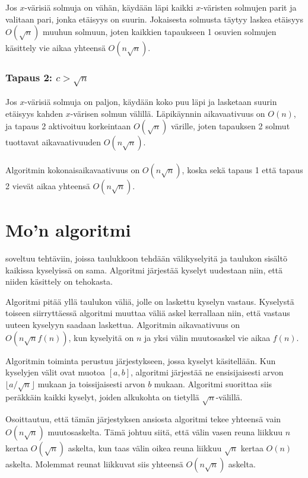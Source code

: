 Jos $x$-värisiä solmuja on vähän,
käydään läpi kaikki $x$-väristen solmujen parit
ja valitaan pari, jonka etäisyys on suurin.
Jokaisesta solmusta täytyy
laskea etäisyys $O(\sqrt n)$ muuhun solmuun,
joten kaikkien tapaukseen 1 osuvien solmujen
käsittely vie aikaa yhteensä $O(n \sqrt n)$.

\subsubsection*{Tapaus 2: $c > \sqrt n$}

Jos $x$-värisiä solmuja on paljon,
käydään koko puu läpi ja
lasketaan suurin etäisyys kahden
$x$-värisen solmun välillä.
Läpikäynnin aikavaativuus on $O(n)$,
ja tapaus 2 aktivoituu korkeintaan $O(\sqrt n)$
värille, joten tapauksen 2 solmut 
tuottavat aikavaativuuden $O(n \sqrt n)$.\\\\
\noindent
Algoritmin kokonaisaikavaativuus on $O(n \sqrt n)$,
koska sekä tapaus 1 että tapaus 2 vievät aikaa
yhteensä $O(n \sqrt n)$.

\section{Mo'n algoritmi}


 soveltuu tehtäviin,
joissa taulukkoon tehdään välikyselyitä ja
taulukon sisältö kaikissa kyselyissä on sama.
Algoritmi järjestää
kyselyt uudestaan niin,
että niiden käsittely on tehokasta.

Algoritmi pitää yllä taulukon väliä,
jolle on laskettu kyselyn vastaus.
Kyselystä toiseen siirryttäessä algoritmi
muuttaa väliä askel kerrallaan niin,
että vastaus uuteen kyselyyn saadaan laskettua.
Algoritmin aikavaativuus on $O(n \sqrt n f(n))$,
kun kyselyitä on $n$ ja 
yksi välin muutosaskel vie aikaa $f(n)$.

Algoritmin toiminta perustuu järjestykseen,
jossa kyselyt käsitellään.
Kun kyselyjen välit ovat muotoa $[a,b]$,
algoritmi järjestää ne ensisijaisesti arvon
$\lfloor a/\sqrt n \rfloor$ mukaan ja toissijaisesti arvon $b$ mukaan.
Algoritmi suorittaa siis peräkkäin kaikki kyselyt,
joiden alkukohta on tietyllä $\sqrt n$-välillä.

Osoittautuu, että tämän järjestyksen ansiosta
algoritmi tekee yhteensä vain $O(n \sqrt n)$ muutosaskelta.
Tämä johtuu siitä, että välin vasen reuna liikkuu
$n$ kertaa $O(\sqrt n)$ askelta,
kun taas välin oikea reuna liikkuu $\sqrt n$
kertaa $O(n)$ askelta. Molemmat reunat liikkuvat
siis yhteensä $O(n \sqrt n)$ askelta.

